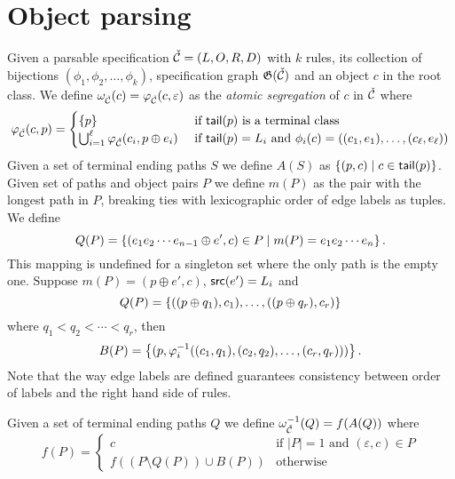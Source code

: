 \section{Object parsing}
Given a parsable specification $\check{\mathcal{C}} = (L,O,R,D)$ with $k$ rules, its collection of bijections $(\phi_1,\phi_2,\dotsc,\phi_k)$, specification graph $\mathfrak{G}(\check{\mathcal{C}})$ and an object $c$ in the root class. We define $\omega_{\check{\mathcal{C}}}(c) = \varphi_{\check{\mathcal{C}}}(c,\varepsilon)$ as the \emph{atomic segregation} of $c$ in $\check{\mathcal{C}}$ where \[
    \varphi_{\check{\mathcal{C}}}(c,p) = \begin{cases}
        \left\{p\right\} & \text{ if } \textsf{tail}(p) \text{ is a terminal class}\\
        \bigcup_{i=1}^\ell\varphi_{\check{\mathcal{C}}}(c_i,p \oplus e_i) & \text{ if }
        \textsf{tail}(p) = L_i \text{ and } \phi_i(c) = ((c_1,e_1),\dotsc,(c_\ell,e_\ell))
    \end{cases}
\]
Given a set of terminal ending paths $S$ we define $A(S)$ as $\left\{(p,c) \mid c \in \textsf{tail}(p)\right\}$. Given set of paths and object pairs $P$ we define $m(P)$ as the pair with the longest path in $P$, breaking ties with lexicographic order of edge labels as tuples. We define 
\[
    Q(P) = \left\{(e_1e_2 \dotsm e_{n-1} \oplus e', c) \in P \mid m(P) = e_1e_2 \dotsm e_n\right\}.
\]
This mapping is undefined for a singleton set where the only path is the empty one. Suppose $m(P) = (p \oplus e', c)$, $\textsf{src}(e') = L_i$ and 
\[
    Q(P) = \left\{((p \oplus q_1), c_1),\dotsc, ((p \oplus q_r), c_r)\right\}
\]
where $q_1 < q_2 < \dotsm < q_r$, then
\[
    B(P) = \left\{(p, \varphi^{-1}_i((c_1,q_1), (c_2,q_2), \dotsc, (c_r,q_r)))\right\}.
\]
Note that the way edge labels are defined guarantees consistency between order of labels and the right hand side of rules.

Given a set of terminal ending paths $Q$ we define 
$\omega^{-1}_{\check{\mathcal{C}}}(Q) = f(A(Q))$ where 
\[
    f(P) = \begin{cases}
        c & \text{if } |P| = 1 \text{ and } (\varepsilon, c) \in P\\
        f(\left(P \setminus Q(P)\right) \cup B(P)) & \text{otherwise}
    \end{cases}
\]




